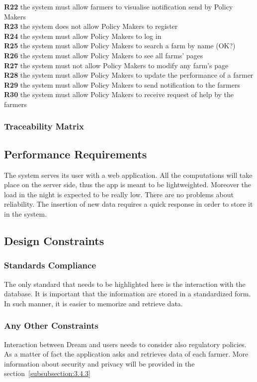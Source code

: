 \documentclass{article}
\begin{document}
\textbf{R22} the system must allow farmers to visualise notification send by Policy Makers\\
\textbf{R23} the system does not allow Policy Makers to register\\
\textbf{R24} the system must allow Policy Makers to log in\\
\textbf{R25} the system must allow Policy Makers to search a farm by name (OK?)\\
\textbf{R26} the system must allow Policy Makers to see all farms’ pages\\
\textbf{R27} the system must not allow Policy Makers to modify any farm’s page\\
\textbf{R28} the system must allow Policy Makers to update the performance of a farmer\\
\textbf{R29} the system must allow Policy Makers to send notification to the farmers\\
\textbf{R30} the system must allow Policy Makers to receive request of help by the farmers\\
\subsubsection{Traceability Matrix}

\subsection{Performance Requirements}
The system serves its user with a web application. All the computations will take place on the server side, 
thus the app is meant to be lightweighted. Moreover the load in the night is expected to be really low.
There are no problems about reliability. The insertion of new data requires a quick response in order to store 
it in the system.

\subsection{Design Constraints}
\subsubsection{Standards Compliance}
The only standard that needs to be highlighted here is the interaction with the database. It is important that the information are stored 
in a standardized form. In such manner, it is easier to memorize and retrieve data.


\subsubsection{Any Other Constraints}
Interaction between Dream and users needs to consider also regulatory policies.
As a matter of fact the application asks and retrieves data of each farmer.
More information about security and privacy will be provided in the section~\ref{subsubsection:3.4.3}
\end{document}
